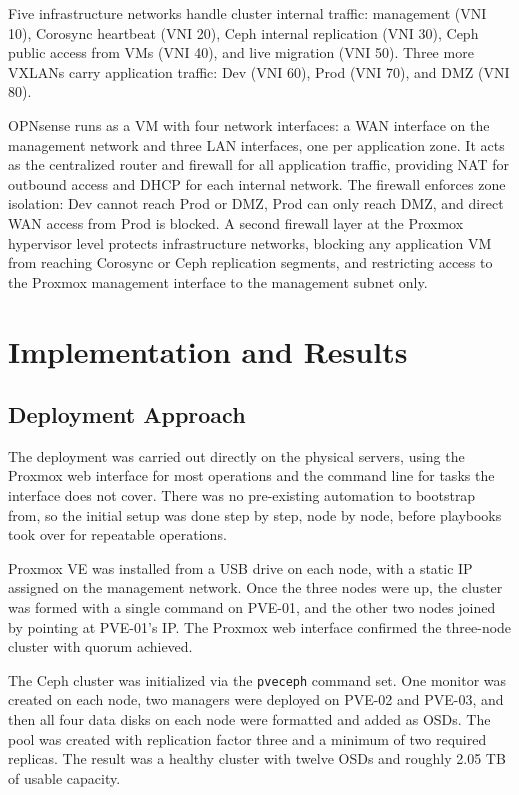 \documentclass[12pt, a4paper]{article}
\begin{document}
Five infrastructure networks handle cluster internal traffic: management (VNI 10), Corosync heartbeat (VNI 20), Ceph internal replication (VNI 30), Ceph public access from VMs (VNI 40), and live migration (VNI 50). Three more VXLANs carry application traffic: Dev (VNI 60), Prod (VNI 70), and DMZ (VNI 80).

OPNsense runs as a VM with four network interfaces: a WAN interface on the management network and three LAN interfaces, one per application zone. It acts as the centralized router and firewall for all application traffic, providing NAT for outbound access and DHCP for each internal network. The firewall enforces zone isolation: Dev cannot reach Prod or DMZ, Prod can only reach DMZ, and direct WAN access from Prod is blocked. A second firewall layer at the Proxmox hypervisor level protects infrastructure networks, blocking any application VM from reaching Corosync or Ceph replication segments, and restricting access to the Proxmox management interface to the management subnet only.

\section{Implementation and Results}

\subsection{Deployment Approach}

The deployment was carried out directly on the physical servers, using the Proxmox web interface for most operations and the command line for tasks the interface does not cover. There was no pre-existing automation to bootstrap from, so the initial setup was done step by step, node by node, before playbooks took over for repeatable operations.

Proxmox VE was installed from a USB drive on each node, with a static IP assigned on the management network. Once the three nodes were up, the cluster was formed with a single command on PVE-01, and the other two nodes joined by pointing at PVE-01's IP. The Proxmox web interface confirmed the three-node cluster with quorum achieved.

The Ceph cluster was initialized via the \texttt{pveceph} command set. One monitor was created on each node, two managers were deployed on PVE-02 and PVE-03, and then all four data disks on each node were formatted and added as OSDs. The pool was created with replication factor three and a minimum of two required replicas. The result was a healthy cluster with twelve OSDs and roughly 2.05 TB of usable capacity.
\end{document}
